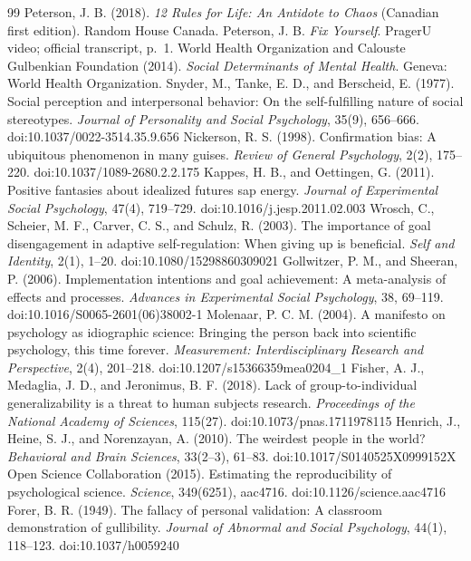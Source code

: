 \documentclass[12pt]{article}
\begin{document}
\begin{thebibliography}{99}
 Peterson, J. B. (2018). \emph{12 Rules for Life: An Antidote to Chaos} (Canadian first edition). Random House Canada.
 Peterson, J. B. \emph{Fix Yourself}. PragerU video; official transcript, p.~1.
 World Health Organization and Calouste Gulbenkian Foundation (2014). \emph{Social Determinants of Mental Health}. Geneva: World Health Organization.
 Snyder, M., Tanke, E. D., and Berscheid, E. (1977). Social perception and interpersonal behavior: On the self-fulfilling nature of social stereotypes. \emph{Journal of Personality and Social Psychology}, 35(9), 656--666. doi:10.1037/0022-3514.35.9.656
 Nickerson, R. S. (1998). Confirmation bias: A ubiquitous phenomenon in many guises. \emph{Review of General Psychology}, 2(2), 175--220. doi:10.1037/1089-2680.2.2.175
 Kappes, H. B., and Oettingen, G. (2011). Positive fantasies about idealized futures sap energy. \emph{Journal of Experimental Social Psychology}, 47(4), 719--729. doi:10.1016/j.jesp.2011.02.003
 Wrosch, C., Scheier, M. F., Carver, C. S., and Schulz, R. (2003). The importance of goal disengagement in adaptive self-regulation: When giving up is beneficial. \emph{Self and Identity}, 2(1), 1--20. doi:10.1080/15298860309021
 Gollwitzer, P. M., and Sheeran, P. (2006). Implementation intentions and goal achievement: A meta-analysis of effects and processes. \emph{Advances in Experimental Social Psychology}, 38, 69--119. doi:10.1016/S0065-2601(06)38002-1
 Molenaar, P. C. M. (2004). A manifesto on psychology as idiographic science: Bringing the person back into scientific psychology, this time forever. \emph{Measurement: Interdisciplinary Research and Perspective}, 2(4), 201--218. doi:10.1207/s15366359mea0204\_1
 Fisher, A. J., Medaglia, J. D., and Jeronimus, B. F. (2018). Lack of group-to-individual generalizability is a threat to human subjects research. \emph{Proceedings of the National Academy of Sciences}, 115(27). doi:10.1073/pnas.1711978115
 Henrich, J., Heine, S. J., and Norenzayan, A. (2010). The weirdest people in the world? \emph{Behavioral and Brain Sciences}, 33(2--3), 61--83. doi:10.1017/S0140525X0999152X
 Open Science Collaboration (2015). Estimating the reproducibility of psychological science. \emph{Science}, 349(6251), aac4716. doi:10.1126/science.aac4716
 Forer, B. R. (1949). The fallacy of personal validation: A classroom demonstration of gullibility. \emph{Journal of Abnormal and Social Psychology}, 44(1), 118--123. doi:10.1037/h0059240

\end{thebibliography}
\end{document}
